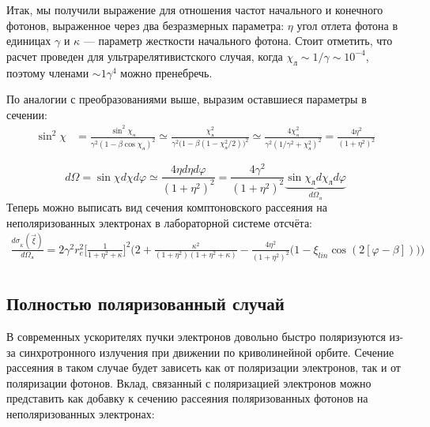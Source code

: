\documentclass[12pt]{article}
\begin{document}
Итак, мы получили выражение для отношения частот начального и конечного фотонов, выраженное через два безразмерных параметра: $\eta$ угол отлета фотона в единицах $\gamma$ и $\kappa$  ---  параметр жесткости начального фотона. Стоит отметить, что расчет проведен для ультрарелятивистского случая, когда $\chi_{\text{л}} \sim 1/\gamma \sim 10^{-4}$, поэтому членами $\sim 1\gamma^4$ можно пренебречь. 
\par По аналогии с преобразованиями выше, выразим оставшиеся параметры в сечении:
\begin{equation}
\begin{split}
\sin^2 \chi &= \frac{\sin^2\chi_{\text{л}}}{\gamma^2 (1 - \beta \cos \chi_{\text{л}})^2} \simeq
\frac{\chi_{\text{л}}^2}{\gamma^2 \big(1 - \beta(1- \chi_{\text{л}}^2/2)\big)^2} \simeq	 \frac{4\chi_{\text{л}}^2}{\gamma^2 (1/\gamma^2 +\chi_{\text{л}}^2)^2} = 
\frac{4\eta^2}{(1+\eta^2)^2} 
\end{split}
\end{equation}

\begin{equation}
d\Omega = \sin \chi d\chi d\varphi \simeq \frac{4\eta d\eta d\varphi}{(1+\eta^2)^2} = \frac{4\gamma^2}{ (1+\eta^2)^2} \underbrace{\sin \chi_{\text{л}} d\chi_{\text{л}} d\varphi}_{d \Omega_{\text{л}}}
\end{equation}
Теперь можно выписать вид сечения комптоновского рассеяния на неполяризованных электронах в лабораторной системе отсчёта:
\begin{equation}
\begin{split}
\frac{d \sigma_{_K}(\vec{\xi})}{d\Omega_{\text{л}}} = 2\gamma^2 r_e^2 \bigg[\frac{1}{1+\eta^2+\kappa}\bigg]^2 \bigg( 2 + \frac{\kappa^2}{(1+\eta^2)(1+\eta^2+\kappa)} - \frac{4\eta^2}{(1+\eta^2)^2} \big(1-\xi_{lin}\cos(2[\varphi - \beta])\big)\bigg) \\
\end{split}
\label{eq:compton_xsec_noEpol_lrf}
\end{equation}
\subsection{Полностью поляризованный случай}
В современных ускорителях пучки электронов довольно быстро поляризуются из-за синхротронного излучения при движении по криволинейной орбите. Сечение рассеяния в таком случае будет зависеть как от поляризации электронов, так и от поляризации фотонов. Вклад, связанный с поляризацией электронов можно представить как добавку к сечению рассеяния поляризованных фотонов на неполяризованных электронах: 
\end{document}
